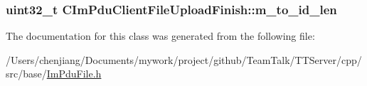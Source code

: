 \subsubsection[{m\+\_\+to\+\_\+id\+\_\+len}]{\setlength{\rightskip}{0pt plus 5cm}uint32\+\_\+t C\+Im\+Pdu\+Client\+File\+Upload\+Finish\+::m\+\_\+to\+\_\+id\+\_\+len\hspace{0.3cm}{\ttfamily [private]}}\label{class_c_im_pdu_client_file_upload_finish_aef6b91cb0d6c8fc4839d6be4d7fdb645}


The documentation for this class was generated from the following file\+:\begin{DoxyCompactItemize}
\item 
/\+Users/chenjiang/\+Documents/mywork/project/github/\+Team\+Talk/\+T\+T\+Server/cpp/src/base/\hyperlink{_im_pdu_file_8h}{Im\+Pdu\+File.\+h}\end{DoxyCompactItemize}
